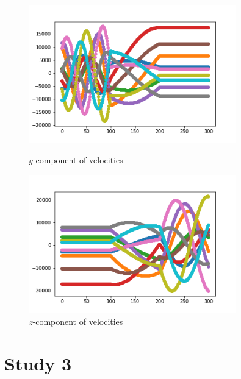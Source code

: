 \documentclass[12pt]{article}
\begin{document}
	\begin{figure}[H]
		\begin{multicols}{2}
			\includegraphics[width=\linewidth, height=6cm]{multivsy2.png} \caption{$y$-component of velocities} \label{multivsy2} \par
			\includegraphics[width=\linewidth, height=6cm]{multivsz2.png} \caption{$z$-component of velocities} \label{multivsz2} \par
		\end{multicols}
	\end{figure}
	
	\section{Study 3}
	
\end{document}
